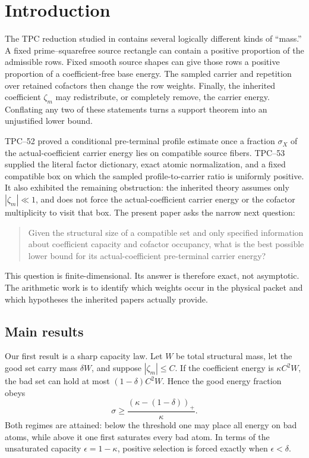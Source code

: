 \section{Introduction}
\label{sec:introduction}

The TPC reduction studied in \citep{WangTPC25,WangTPC48,WangTPC50}
contains several logically different kinds of ``mass.''  A fixed
prime--squarefree source rectangle can contain a positive proportion of
the admissible rows.  Fixed smooth source shapes can give those rows a
positive proportion of a coefficient-free base energy.  The sampled
carrier and repetition over retained cofactors then change the row
weights.  Finally, the inherited coefficient \(\zeta_m\) may redistribute,
or completely remove, the carrier energy.  Conflating any two of these
statements turns a support theorem into an unjustified lower bound.

TPC--52 \citep{WangTPC52} proved a conditional pre-terminal profile
estimate once a fraction \(\sigma_X\) of the actual-coefficient carrier
energy lies on
compatible source fibers.  TPC--53 \citep{WangTPC53} supplied the literal
factor dictionary, exact atomic normalization, and a fixed compatible box
on which the sampled profile-to-carrier ratio is uniformly positive.  It
also exhibited the remaining obstruction: the inherited theory assumes
only \(|\zeta_m|\ll1\), and does not force the actual-coefficient carrier
energy or the cofactor multiplicity to visit that box.  The present paper
asks the narrow next question:

\begin{quote}
Given the structural size of a compatible set and only specified
information about coefficient capacity and cofactor occupancy, what is the
best possible lower bound for its actual-coefficient pre-terminal carrier
energy?
\end{quote}

This question is finite-dimensional.  Its answer is therefore exact, not
asymptotic.  The arithmetic work is to identify which weights occur in the
physical packet and which hypotheses the inherited papers actually
provide.

\subsection{Main results}

Our first result is a sharp capacity law.  Let \(W\) be total structural
mass, let the good set carry mass \(\delta W\), and suppose
\(|\zeta_m|\le C\).  If the coefficient energy is \(\kappa C^2W\), the bad set
can hold at most \((1-\delta)C^2W\).  Hence the good energy fraction obeys
\[
 \sigma\ge
 \frac{(\kappa-(1-\delta))_+}{\kappa}.
\]
Both regimes are attained: below the threshold one may place all energy
on bad atoms, while above it one first saturates every bad atom.  In terms
of the unsaturated capacity \(\epsilon=1-\kappa\), positive selection is
forced exactly when \(\epsilon<\delta\).

